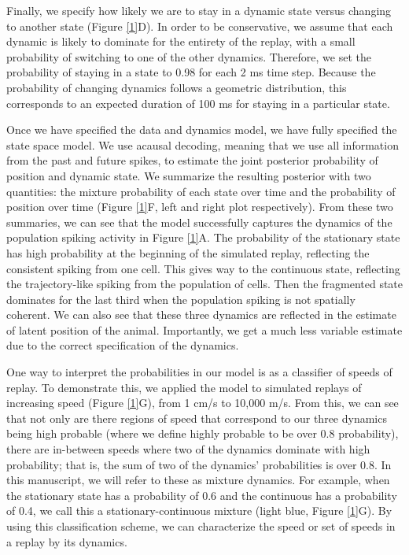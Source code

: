 \documentclass[times, twoside]{zHenriquesLab-StyleBioRxiv}
\begin{document}
Finally, we specify how likely we are to stay in a dynamic state versus changing to another state (Figure \ref{1}D). In order to be conservative, we assume that each dynamic is likely to dominate for the entirety of the replay, with a small probability of switching to one of the other dynamics. Therefore, we set the probability of staying in a state to 0.98 for each 2 ms time step. Because the probability of changing dynamics follows a geometric distribution, this corresponds to an expected duration of 100 ms for staying in a particular state.

Once we have specified the data and dynamics model, we have fully specified the state space model. We use acausal decoding, meaning that we use all information from the past and future spikes, to estimate the joint posterior probability of position and dynamic state. We summarize the resulting posterior with two quantities: the mixture probability of each state over time and the probability of position over time (Figure \ref{1}F, left and right plot respectively). From these two summaries, we can see that the model successfully captures the dynamics of the population spiking activity in Figure \ref{1}A. The probability of the stationary state has high probability at the beginning of the simulated replay, reflecting the consistent spiking from one cell. This gives way to the continuous state, reflecting the trajectory-like spiking from the population of cells. Then the fragmented state dominates for the last third when the population spiking is not spatially coherent. We can also see that these three dynamics are reflected in the estimate of latent position of the animal.  Importantly, we get a much less variable estimate due to the correct specification of the dynamics.

One way to interpret the probabilities in our model is as a classifier of speeds of replay. To demonstrate this, we applied the model to simulated replays of increasing speed (Figure \ref{1}G), from 1 cm/s to 10,000 m/s. From this, we can see that not only are there regions of speed that correspond to our three dynamics being high probable (where we define highly probable to be over 0.8 probability), there are in-between speeds where two of the dynamics dominate with high probability; that is, the sum of two of the dynamics' probabilities is over 0.8. In this manuscript, we will refer to these as mixture dynamics. For example, when the stationary state has a probability of 0.6 and the continuous has a probability of 0.4, we call this a stationary-continuous mixture (light blue, Figure \ref{1}G). By using this classification scheme, we can characterize the speed or set of speeds in a replay by its dynamics.
\end{document}
